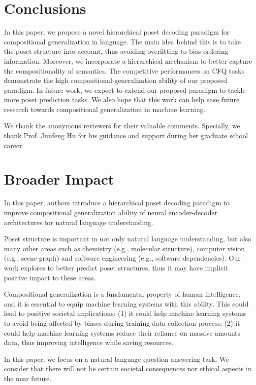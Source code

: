 \documentclass{article}
\begin{document}
\section{Conclusions}

In this paper, we propose a novel hierarchical poset decoding paradigm for compositional generalization in language. The main idea behind this is to take the poset structure into account, thus avoiding overfitting to bias ordering information. Moreover, we incorporate a hierarchical mechanism to better capture the compositionality of semantics. The competitive performances on CFQ tasks demonstrate the high compositional generalization ability  of our proposed paradigm.
In future work, we expect to extend our proposed paradigm to tackle more poset prediction tasks.
We also hope that this work can help ease future research towards compositional generalization in machine learning.







\begin{ack}
We thank the anonymous reviewers for their valuable comments. Specially, we thank Prof. Junfeng Hu for his guidance and support during her graduate school career.
\end{ack}

\section*{Broader Impact}

In this paper, authors introduce a hierarchical poset decoding paradigm to improve compositional generalization ability of neural encoder-decoder architectures for natural language understanding.

Poset structure is important in not only natural language understanding, but also many other areas such as chemistry (e.g., molecular structure), computer vision (e.g., scene graph) and software engineering (e.g., software dependencies).
Our work explores to better predict poset structures, thus it may have implicit positive impact to these areas.

Compositional generalization is a fundamental property of human intelligence, and it is essential to equip machine learning systems with this ability.
This could lead to positive societal implications:
(1) it could help machine learning systems to avoid being affected by biases during training data collection process;
(2) it could help machine learning systems reduce their reliance on massive amounts data, thus improving intelligence while saving resources.

In this paper, we focus on a natural language question answering task.
We consider that there will not be certain societal consequences nor ethical aspects in the near future.












\end{document}
